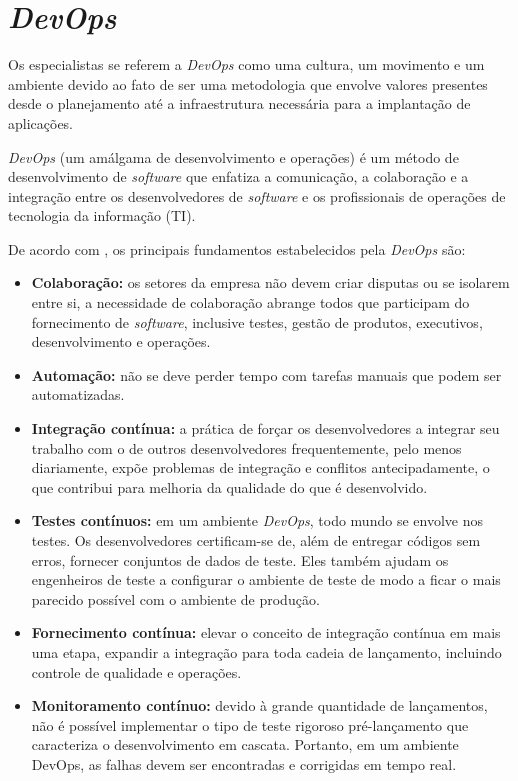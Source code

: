 \documentclass[
	12pt,				%
	openright,			%
	oneside,			%
	a4paper,			%
	english,			%
	french,				%
	spanish,			%
	brazil,				%
	]{abntex2}
\begin{document}
\section{\textit{DevOps}}

Os especialistas se referem a \textit{DevOps} como uma cultura, um movimento e um ambiente devido ao fato de ser uma metodologia que envolve valores presentes desde o planejamento até a infraestrutura necessária para a implantação de aplicações.

\begin{citacao}
	\textit{DevOps} (um amálgama de desenvolvimento e operações) é um método de desenvolvimento de \textit{software} que enfatiza a comunicação, a colaboração e a integração entre os desenvolvedores de \textit{software} e os profissionais de operações de tecnologia da informação (TI).
\end{citacao}

De acordo com , os principais fundamentos estabelecidos pela \textit{DevOps} são:

\begin{itemize}
	\item \textbf{Colaboração:} os setores da empresa não devem criar disputas ou se isolarem entre si, a necessidade de colaboração abrange todos que participam do fornecimento de \textit{software}, inclusive testes, gestão de produtos, executivos, desenvolvimento e operações.
	\item \textbf{Automação:} não se deve perder tempo com tarefas manuais que podem ser automatizadas.
	\item \textbf{Integração contínua:} a prática de forçar os desenvolvedores a integrar seu trabalho com o de outros desenvolvedores frequentemente, pelo menos diariamente, expõe problemas de integração e conflitos antecipadamente, o que contribui para melhoria da qualidade do que é desenvolvido.
	\item \textbf{Testes contínuos:} em um ambiente \textit{DevOps}, todo mundo se envolve nos testes. Os desenvolvedores certificam-se de, além de entregar códigos sem erros, fornecer conjuntos de dados de teste. Eles também ajudam os engenheiros de teste a configurar o ambiente de teste de modo a ficar o mais parecido possível com o ambiente de produção.
	\item \textbf{Fornecimento contínua:} elevar o conceito de integração contínua em mais uma etapa, expandir a integração para toda cadeia de lançamento, incluindo controle de qualidade e operações.
	\item \textbf{Monitoramento contínuo:} devido à grande quantidade de lançamentos, não é possível implementar o tipo de teste rigoroso pré-lançamento que caracteriza o desenvolvimento em cascata. Portanto, em um ambiente DevOps, as falhas devem ser encontradas e corrigidas em tempo real.
\end{itemize}
\end{document}
